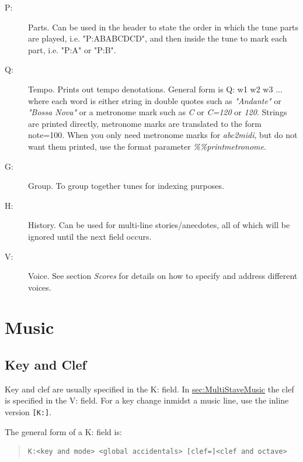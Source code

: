 \documentclass[a4paper]{article}
\begin{document}
\begin{description}
\item[P:] Parts. Can be used in the header to state the order in  which
the  tune parts are played, i.e. "P:ABABCDCD", and then inside the
tune to mark each part, i.e. "P:A" or "P:B".

 
\item[Q:] Tempo. 
Prints out tempo denotations.
General form is Q: w1 w2 w3 ... where each word is either
string in double quotes such as {\it "Andante"} or {\it "Bossa Nova"}
or a metronome mark such as {\it C} or {\it C=120} or {\it 120}.
Strings are printed directly, metronome marks are translated 
to the form note=100. When you only need metronome marks for 
{\it abc2midi}, but do not want them printed, use the format parameter
{\it \%\%printmetronome}.

\item[G:] Group. To group together tunes for indexing purposes.

\item[H:] History. Can be used for multi-line stories/anecdotes, all of
which will be ignored until the next field occurs.

\item[V:] Voice. See section {\it Scores} for details on how to
specify and address different voices.

\end{description}

\section{Music}

\subsection{Key and Clef}
\label{sec:KeyAndClef}
 
Key and clef are usually specified in the K: field. In 
\hyperref{multi stave music,}{multi stave music, (see section }{)}
{sec:MultiStaveMusic} the clef is specified in the V: field.
For a key change inmidst a music line, use the inline version \verb$[K:]$.
\par
The general form of a K: field is:
\begin{quote}
\begin{verbatim}
K:<key and mode> <global accidentals> [clef=]<clef and octave>
\end{verbatim}
\end{quote}
\end{document}
